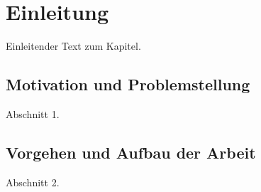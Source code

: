 \chapter{Einleitung\label{chap1:Erstes-Kapitel}}

Einleitender Text zum Kapitel.



\section{Motivation und Problemstellung\label{sec1.1:Unterpunkt-1}}

Abschnitt 1.

\section{Vorgehen und Aufbau der Arbeit\label{sec1.2:Unterpunkt-2}}

Abschnitt 2.